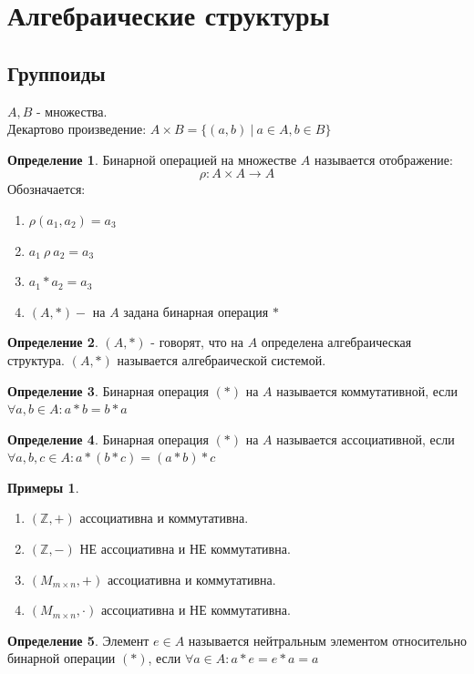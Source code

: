 \documentclass[a4paper, 12pt]{article}
\newcommand{\Z}{\mathbb Z}
\newcommand\tab[1][.5cm]{\hspace*{#1}}
\theoremstyle{definition}
\newtheorem*{definition}{Определение}
\newtheorem*{example}{Примеры}
\begin{document}
  \newpage
  
  \section{Алгебраические структуры}
  \subsection{Группоиды}
  $A,B$ - множества. \\
  Декартово произведение: $A \times B = \{(a,b)\ |\ a \in A, b \in B\}$ 
  \begin{definition}
    Бинарной операцией на множестве $A$ называется отображение: $$\rho:A \times A \to A$$ 
    Обозначается: \begin{enumerate}
      \item $\rho(a_1,a_2) = a_3$
      \item $a_1 \ \rho \ a_2 = a_3$
      \item $a_1 * a_2 = a_3$ 
      \item $(A, *) - $ на $A$ задана бинарная операция $*$ 
    \end{enumerate}
  \end{definition}    
  \begin{definition}
    $(A,*)$ - говорят, что на $A$ определена алгебраическая структура. $(A,*)$ называется алгебраической системой. 
  \end{definition} 
  \begin{definition}
    Бинарная операция $(*)$ на $A$ называется коммутативной, если $\forall a,b \in A: a*b=b*a$ 
  \end{definition} 
  \begin{definition}
    Бинарная операция $(*)$ на $A$ называется ассоциативной, если $\forall a,b,c \in A: a*(b*c)=(a*b)*c$ 
  \end{definition}
  \begin{example}
    \begin{enumerate} \tab
      \item $(\Z, +)$ ассоциативна и коммутативна. 
      \item $(\Z, -)$ НЕ ассоциативна и НЕ коммутативна.
      \item $(M_{m \times n}, +)$ ассоциативна и коммутативна.
      \item $(M_{m \times n}, \cdot)$ ассоциативна и НЕ коммутативна.
    \end{enumerate}
  \end{example}
  \begin{definition}
    Элемент $e \in A$ называется нейтральным элементом относительно бинарной операции $(*)$, если $\forall a \in A: a*e = e*a = a$ 
  \end{definition} 
\end{document}
